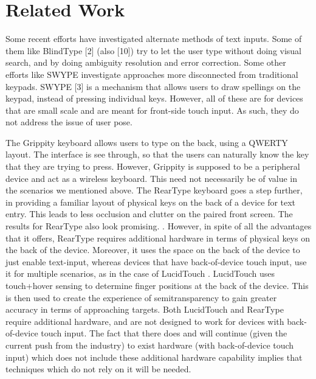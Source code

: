 \section{Related Work}

Some recent efforts have investigated alternate methods of text inputs. Some of them like BlindType [2] (also [10]) try to let the user type without doing visual search, and by doing ambiguity resolution and error correction. Some other efforts like SWYPE investigate approaches more disconnected from traditional keypads. SWYPE [3] is a mechanism that allows users to draw spellings on the keypad, instead of pressing individual keys. However, all of these are for devices that are small scale and are meant for front-side touch input.  As such, they do not address the issue of user pose.

The Grippity keyboard  allows users to type on the back, using a QWERTY layout. The interface is see through, so that the users can naturally know the key that they are trying to press. However, Grippity is supposed to be a peripheral device and act as a wireless keyboard. This need not necessarily be of value in the scenarios we mentioned above. The RearType keyboard goes a step further, in providing a familiar layout of physical keys on the back of a device for text entry. This leads to less occlusion and clutter on the paired front screen. The results for RearType also look promising. . However, in spite of all the advantages that it offers, RearType requires additional hardware in terms of physical keys on the back of the device. Moreover, it uses the space on the back of the device to just enable text-input, whereas devices that have back-of-device touch input, use it for multiple scenarios, as in the case of LucidTouch . LucidTouch uses touch+hover sensing to determine finger positions at the back of the device. This is then used to create the experience of semitransparency to gain greater accuracy in terms of approaching targets. Both LucidTouch and RearType require additional hardware, and are not designed to work for devices with back-of-device touch input.  The fact that there does and will continue (given the current push from the industry) to exist hardware (with back-of-device touch input) which does not include these additional hardware capability implies that techniques which do not rely on it will be needed.

